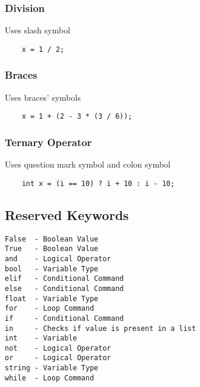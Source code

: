 \documentclass[12pt,letterpaper]{article}
\begin{document}
\subsubsection{Division}
Uses slash symbol
\begin{verbatim}
    x = 1 / 2;
\end{verbatim}

\subsubsection{Braces}
Uses braces' symbols
\begin{verbatim}
    x = 1 + (2 - 3 * (3 / 6));
\end{verbatim}

\subsubsection{Ternary Operator}
Uses question mark symbol and colon symbol
\begin{verbatim}
    int x = (i == 10) ? i + 10 : i - 10;
\end{verbatim}

\subsection{Reserved Keywords}
\begin{verbatim}
False  - Boolean Value
True   - Boolean Value
and    - Logical Operator
bool   - Variable Type
elif   - Conditional Command
else   - Conditional Command
float  - Variable Type
for    - Loop Command
if     - Conditional Command
in     - Checks if value is present in a list
int    - Variable
not    - Logical Operator
or     - Logical Operator
string - Variable Type
while  - Loop Command
\end{verbatim}
\end{document}
